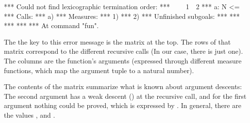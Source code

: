 \begin{isabellebody}
\begin{isamarkuptext}
\begin{isabelle}
*** Could not find lexicographic termination order:\newline
*** \ \ \ \ 1\ \ 2  \newline
*** a:  N   <= \newline
*** Calls:\newline
*** a) \newline
*** Measures:\newline
*** 1) \newline
*** 2) \newline
*** Unfinished subgoals:\newline
*** \newline
*** \quad {}\newline
***  \quad {}\newline
***  \newline
*** At command "fun".\newline
\end{isabelle}%
\end{isamarkuptext}%
\isamarkuptrue%
%
\begin{isamarkuptext}%
The the key to this error message is the matrix at the top. The rows
  of that matrix correspond to the different recursive calls (In our
  case, there is just one). The columns are the function's arguments 
  (expressed through different measure functions, which map the
  argument tuple to a natural number). 

  The contents of the matrix summarize what is known about argument
  descents: The second argument has a weak descent (\isa{{\isacharless}{\isacharequal}}) at the
  recursive call, and for the first argument nothing could be proved,
  which is expressed by . In general, there are the values
  \isa{{\isacharless}}, \isa{{\isacharless}{\isacharequal}} and .


\end{isamarkuptext}
\end{isabellebody}
